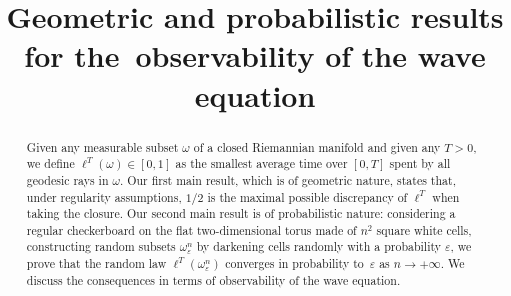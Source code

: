 \documentclass[JEP,XML,SOM,Unicode, NoEqCountersInSection,NoFloatCountersInSection,published]{cedram}
\theoremstyle{definition}
\begin{document}
\title{Geometric and probabilistic results for the~observability of the wave equation}

\author[\initial{E.} \lastname{Humbert}]{ }
\address{Institut Denis Poisson, UFR Sciences et Technologie, Faculté François Rabelais\\
Parc de Grandmont, 37200 Tours, France}

\author[\initial{Y.} \lastname{Privat}]{ }
\address{IRMA, Université de Strasbourg, CNRS UMR 7501\\
7 rue René Descartes, 67084 Strasbourg, France\\
\& Institut Universitaire de France (IUF)}

\author[\initial{E.} \lastname{Trélat}]{ }
\address{Sorbonne Université, CNRS, Université de Paris, Inria, Laboratoire Jacques-Louis Lions (LJLL)\\
F-75005 Paris, France}

\begin{abstract}
Given any measurable subset $\omega$ of a closed Riemannian manifold and given any $T>0$, we define $\ell^T(\omega)\in[0,1]$ as the smallest average time over $[0,T]$ spent by all geodesic rays in $\omega$. Our first main result, which is of geometric nature, states that, under regularity assumptions, $1/2$ is the maximal possible discrepancy of $\ell^T$ when taking the closure. Our second main result is of probabilistic nature: considering a regular checkerboard on the flat two-dimensional torus made of $n^2$ square white cells, constructing random subsets $\omega_\varepsilon^n$ by darkening cells randomly with a probability $\varepsilon$, we prove that the random law $\ell^T(\omega_\varepsilon^n)$ converges in probability to~$\varepsilon$ as $n\rightarrow+\infty$. We discuss the consequences in terms of observability of the wave equation.
\end{abstract}
\end{document}
